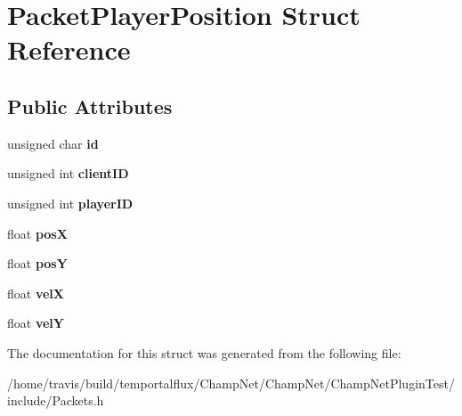 \hypertarget{struct_packet_player_position}{\section{Packet\-Player\-Position Struct Reference}
\label{struct_packet_player_position}
}
\subsection*{Public Attributes}
\begin{DoxyCompactItemize}
\item 
\hypertarget{struct_packet_player_position_ad80364604ce3113e51136c2b0ca5d6e0}{unsigned char {\bfseries id}}\label{struct_packet_player_position_ad80364604ce3113e51136c2b0ca5d6e0}

\item 
\hypertarget{struct_packet_player_position_a3647ac419f4e01afe948da2468b67658}{unsigned int {\bfseries client\-I\-D}}\label{struct_packet_player_position_a3647ac419f4e01afe948da2468b67658}

\item 
\hypertarget{struct_packet_player_position_a94c602eaa03f27c22937d37257368ab6}{unsigned int {\bfseries player\-I\-D}}\label{struct_packet_player_position_a94c602eaa03f27c22937d37257368ab6}

\item 
\hypertarget{struct_packet_player_position_a1719505fbc59c8f4948cfec4772859b0}{float {\bfseries pos\-X}}\label{struct_packet_player_position_a1719505fbc59c8f4948cfec4772859b0}

\item 
\hypertarget{struct_packet_player_position_a401e60ee7a35eaa7154827814082f794}{float {\bfseries pos\-Y}}\label{struct_packet_player_position_a401e60ee7a35eaa7154827814082f794}

\item 
\hypertarget{struct_packet_player_position_a4f4b56eb20f827dec38d7ddaf8ea0f13}{float {\bfseries vel\-X}}\label{struct_packet_player_position_a4f4b56eb20f827dec38d7ddaf8ea0f13}

\item 
\hypertarget{struct_packet_player_position_abcf1d97becbe982654e73cc9ec8d88c8}{float {\bfseries vel\-Y}}\label{struct_packet_player_position_abcf1d97becbe982654e73cc9ec8d88c8}

\end{DoxyCompactItemize}


The documentation for this struct was generated from the following file\-:\begin{DoxyCompactItemize}
\item 
/home/travis/build/temportalflux/\-Champ\-Net/\-Champ\-Net/\-Champ\-Net\-Plugin\-Test/include/Packets.\-h\end{DoxyCompactItemize}
